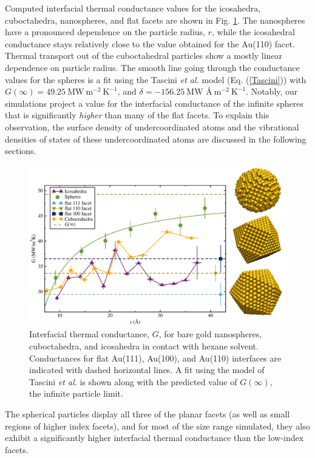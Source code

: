 Computed interfacial thermal conductance values for the icosahedra,
cuboctahedra, nanospheres, and flat facets are shown in
Fig. \ref{fig:ico_vs_sphere}.  The nanospheres have a pronounced
dependence on the particle radius, $r$, while the icosahedral
conductance stays relatively close to the value obtained for the
Au(110) facet. Thermal transport out of the cuboctahedral particles
show a mostly linear dependence on particle radius.  The smooth line
going through the conductance values for the spheres is a fit using
the Tascini \textit{et al.}\cite{Tascini2016} model
(Eq. (\ref{Tascini})) with
$G(\infty) = 49.25~\text{MW}~\text{m}^{-2}~\text{K}^{-1}$, and
$\delta = -156.25~\text{MW \AA}~\text{m}^{-2}~\text{K}^{-1}$.
Notably, our simulations project a value for the interfacial
conductance of the infinite spheres that is significantly
\textit{higher} than many of the flat facets.  To explain this
observation, the surface density of undercoordinated atoms
and the vibrational densities of states of these undercoordinated
atoms are discussed in the following sections.

\begin{figure}
\includegraphics[width=\linewidth]{figures/g-ico-spher-cub.pdf}
	\caption{Interfacial thermal conductance, $G$, for bare gold
          nanospheres, cuboctahedra, and icosahedra in contact with
          hexane solvent. Conductances for flat Au(111), Au(100), and
          Au(110) interfaces are indicated with dashed horizontal
          lines.  A fit using the model of Tascini \textit{et al.} is
          shown along with the predicted value of $G(\infty)$, the
          infinite particle limit.}
	\label{fig:ico_vs_sphere}
\end{figure}

The spherical particles display all three of the planar facets (as
well as small regions of higher index facets), and for most of the
size range simulated, they also exhibit a significantly higher
interfacial thermal conductance than the low-index facets.

